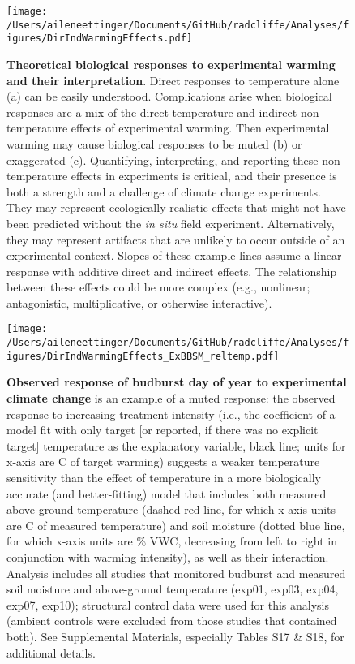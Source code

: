 \documentclass{article}
\begin{document}
 \clearpage
 \begin{figure}[h!]
\centering
 \texttt{[image: /Users/aileneettinger/Documents/GitHub/radcliffe/Analyses/figures/DirIndWarmingEffects.pdf]} 
 \caption{\textbf{Theoretical biological responses to experimental warming and their interpretation}. Direct responses to temperature alone (a) can be easily understood. Complications arise when biological responses are a mix of the direct temperature and indirect non-temperature effects of experimental warming. Then experimental warming may cause biological responses to be muted (b) or exaggerated (c). Quantifying, interpreting, and reporting these non-temperature effects in experiments is critical, and their presence is both a strength and a challenge of climate change experiments. They may represent ecologically realistic effects that might not have been predicted without the \emph{in situ} field experiment. Alternatively, they may represent artifacts that are unlikely to occur outside of an experimental context. Slopes of these example lines assume a linear response with additive direct and indirect effects. The relationship between these effects could be more complex (e.g., nonlinear; antagonistic, multiplicative, or otherwise interactive).} 
\label{fig:biolimp}
\end{figure}
\clearpage
\begin{figure}[h!]
\centering
 \texttt{[image: /Users/aileneettinger/Documents/GitHub/radcliffe/Analyses/figures/DirIndWarmingEffects\_ExBBSM\_reltemp.pdf]} 
 \caption{\textbf{Observed response of budburst day of year to experimental climate change} is an example of a muted response: the observed response to increasing treatment intensity (i.e., the coefficient of a model fit with only target [or reported, if there was no explicit target] temperature as the explanatory variable, black line; units for x-axis are \degree C of target warming) suggests a weaker temperature sensitivity than the effect of temperature in a more biologically accurate (and better-fitting) model that includes both measured above-ground temperature (dashed red line, for which x-axis units are \degree C of measured temperature) and soil moisture (dotted blue line, for which x-axis units are \% VWC, decreasing from left to right in conjunction with warming intensity), as well as their interaction. Analysis includes all studies that monitored budburst and measured soil moisture and above-ground temperature (exp01, exp03, exp04, exp07, exp10); structural control data were used for this analysis (ambient controls were excluded from those studies that contained both). See Supplemental Materials, especially Tables S17 \& S18, for additional details.} 
 
\label{fig:phen}
\end{figure}
\clearpage
\end{document}
